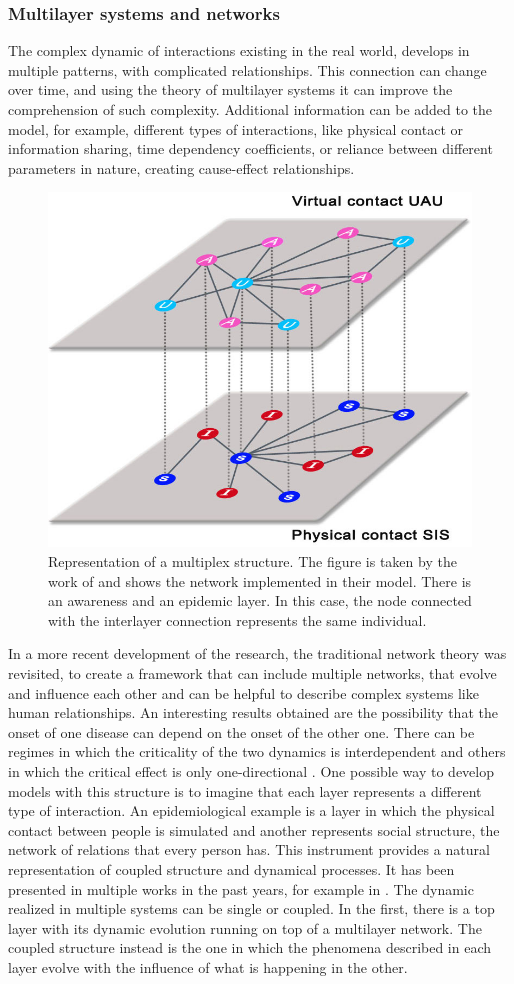 \subsubsection{Multilayer systems and networks} 
The complex dynamic of interactions existing in the real world, develops in multiple patterns, with complicated relationships. This connection can change over time, and using the theory of multilayer systems it can improve the comprehension of such complexity. Additional information can be added to the model, for example, different types of interactions, like physical contact or information sharing, time dependency coefficients, or reliance between different parameters in nature, creating cause-effect relationships.
\begin{figure}[h]
	\centering
	\includegraphics[width=0.6\linewidth]{0_introduction/images_introduction/multi_layer}
	\caption[Multi-layer network]{Representation of a multiplex structure. The figure is taken by the work of \cite{Granell2013} and shows the network implemented in their model. There is an awareness and an epidemic layer. In this case, the node connected with the interlayer connection represents the same individual.}
	\label{fig:multilayer}
\end{figure} 
In a more recent development of the research, the traditional network theory was revisited, to create a framework that can include multiple networks, that evolve and influence each other \cite{DeDomenico2016, Krickel_2023} and can be helpful to describe complex systems like human relationships. An interesting results obtained are the possibility that the onset of one disease can depend on the onset of the other one. There can be regimes in which the criticality of the two dynamics is interdependent and others in which the critical effect is only one-directional \cite{DeDomenico2016}. 
One possible way to develop models with this structure is to imagine that each layer represents a different type of interaction. An epidemiological example is a layer in which the physical contact between people is simulated and another represents social structure, the network of relations that every person has. This instrument provides a natural representation of coupled structure and dynamical processes. It has been presented in multiple works in the past years, for example in \cite{Wang_2019}. The dynamic realized in multiple systems can be single or coupled. In the first, there is a top layer with its dynamic evolution running on top of a multilayer network. The coupled structure instead is the one in which the phenomena described in each layer evolve with the influence of what is happening in the other. 



